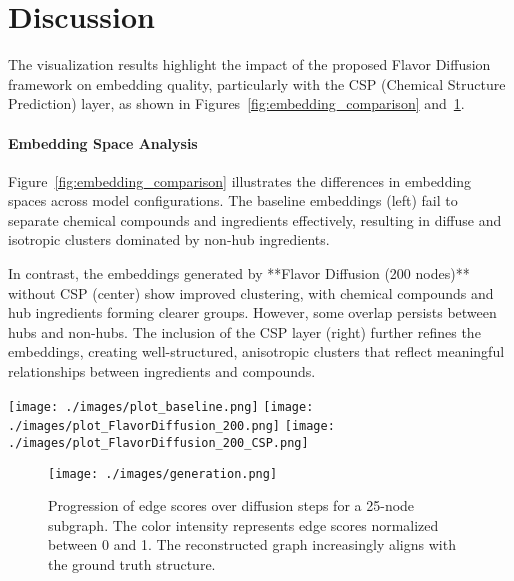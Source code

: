\section{Discussion}

The visualization results highlight the impact of the proposed Flavor Diffusion framework on embedding quality, particularly with the CSP (Chemical Structure Prediction) layer, as shown in Figures~\ref{fig:embedding_comparison} and~\ref{fig:generation_example}.

\paragraph{Embedding Space Analysis}
Figure~\ref{fig:embedding_comparison} illustrates the differences in embedding spaces across model configurations. The baseline embeddings (left) fail to separate chemical compounds and ingredients effectively, resulting in diffuse and isotropic clusters dominated by non-hub ingredients. 

In contrast, the embeddings generated by **Flavor Diffusion (200 nodes)** without CSP (center) show improved clustering, with chemical compounds and hub ingredients forming clearer groups. However, some overlap persists between hubs and non-hubs. The inclusion of the CSP layer (right) further refines the embeddings, creating well-structured, anisotropic clusters that reflect meaningful relationships between ingredients and compounds.

\begin{figure*}[t!]
  \centering
  \texttt{[image: ./images/plot\_baseline.png]} \hfill
  \texttt{[image: ./images/plot\_FlavorDiffusion\_200.png]} \hfill
  \texttt{[image: ./images/plot\_FlavorDiffusion\_200\_CSP.png]}
  \caption{Embedding space comparison under different configurations. 
  (Left) Baseline embeddings show poor separation between ingredients and compounds. 
  (Center) Flavor Diffusion (200 nodes) without CSP achieves improved clustering of chemical compounds and hub ingredients. 
  (Right) Flavor Diffusion (200 nodes) with CSP results in well-defined clusters, leveraging chemical fingerprints to enhance separation.}
  \label{fig:embedding_comparison}
\end{figure*}

\begin{figure}[h!]
    \centering
    \texttt{[image: ./images/generation.png]}
    \caption{Progression of edge scores over diffusion steps for a 25-node subgraph. The color intensity represents edge scores normalized between 0 and 1. The reconstructed graph increasingly aligns with the ground truth structure.}
    \label{fig:generation_example}
\end{figure}

